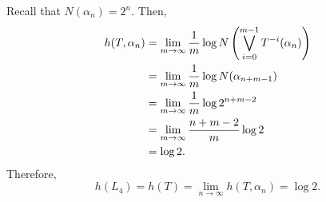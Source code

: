 \documentclass[10pt,twoside,draft]{book}
\begin{document}
Recall that $N(\alpha_{n}) = 2^n$.
Then,
\begin{align*}
  h(T, \alpha_n)
  &= \lim\limits_{m \to \infty} \frac{1}{m} \log N\left (  \bigvee\limits_{i = 0}^{m-1} T^{-i}(\alpha_n) \right )  \\
  &= \lim\limits_{m \to \infty} \frac{1}{m} \log N(\alpha_{n+m-1})  \\
  &= \lim\limits_{m \to \infty} \frac{1}{m} \log 2^{n + m - 2}  \\
  &= \lim\limits_{m \to \infty} \frac{n + m - 2}{m} \log 2 \\
  &= \log 2.
\end{align*}
Therefore,
\begin{equation*}
  h(L_4) = h(T) = \lim\limits_{n \to \infty} h(T, \alpha_n) = \log 2.
\end{equation*}
\end{document}
